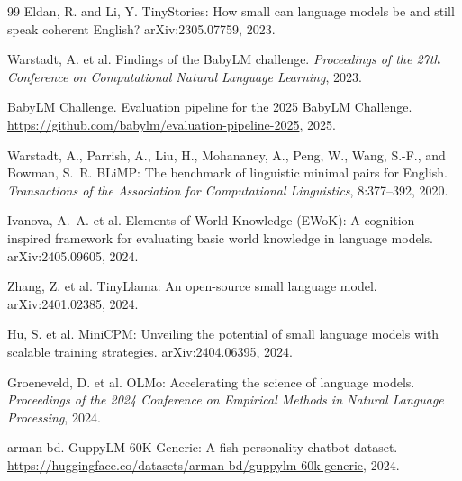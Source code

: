 \documentclass[11pt]{article}
\begin{document}
\begin{thebibliography}{99}
Eldan, R. and Li, Y. TinyStories: How small can language models be and still speak coherent English? arXiv:2305.07759, 2023.

Warstadt, A. et al. Findings of the BabyLM challenge. \emph{Proceedings of the 27th Conference on Computational Natural Language Learning}, 2023.

BabyLM Challenge. Evaluation pipeline for the 2025 BabyLM Challenge. \url{https://github.com/babylm/evaluation-pipeline-2025}, 2025.

Warstadt, A., Parrish, A., Liu, H., Mohananey, A., Peng, W., Wang, S.-F., and Bowman, S.~R. BLiMP: The benchmark of linguistic minimal pairs for English. \emph{Transactions of the Association for Computational Linguistics}, 8:377--392, 2020.

Ivanova, A.~A. et al. Elements of World Knowledge (EWoK): A cognition-inspired framework for evaluating basic world knowledge in language models. arXiv:2405.09605, 2024.

Zhang, Z. et al. TinyLlama: An open-source small language model. arXiv:2401.02385, 2024.

Hu, S. et al. MiniCPM: Unveiling the potential of small language models with scalable training strategies. arXiv:2404.06395, 2024.

Groeneveld, D. et al. OLMo: Accelerating the science of language models. \emph{Proceedings of the 2024 Conference on Empirical Methods in Natural Language Processing}, 2024.

arman-bd. GuppyLM-60K-Generic: A fish-personality chatbot dataset. \url{https://huggingface.co/datasets/arman-bd/guppylm-60k-generic}, 2024.

\end{thebibliography}
\end{document}
